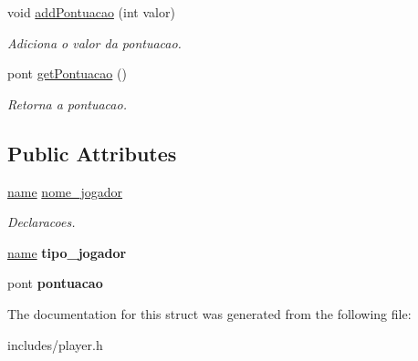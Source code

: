 \begin{DoxyCompactItemize}
void \hyperlink{structpl_1_1Player_a28cc93228bd7a418e44c5e03ff15c07e}{add\+Pontuacao} (int valor)
\begin{DoxyCompactList}\small\item\em Adiciona o valor da pontuacao. \end{DoxyCompactList}\item 
\mbox{\label{structpl_1_1Player_a8ce6bc7949b1f6d2c59e78f701835767}} 
pont \hyperlink{structpl_1_1Player_a8ce6bc7949b1f6d2c59e78f701835767}{get\+Pontuacao} ()
\begin{DoxyCompactList}\small\item\em Retorna a pontuacao. \end{DoxyCompactList}\end{DoxyCompactItemize}
\subsection*{Public Attributes}
\begin{DoxyCompactItemize}
\item 
\mbox{\label{structpl_1_1Player_afa453fd1732545ddbcdb63fb7c0e091c}} 
\hyperlink{structpl_1_1Player_a77a12ed18c2601e66b9357ce1a2c1d2b}{name} \hyperlink{structpl_1_1Player_afa453fd1732545ddbcdb63fb7c0e091c}{nome\+\_\+jogador}
\begin{DoxyCompactList}\small\item\em Declaracoes. \end{DoxyCompactList}\item 
\mbox{\label{structpl_1_1Player_a44ef293c5b8359c91d5cd3625d0fe7e6}} 
\hyperlink{structpl_1_1Player_a77a12ed18c2601e66b9357ce1a2c1d2b}{name} {\bfseries tipo\+\_\+jogador}
\item 
\mbox{\label{structpl_1_1Player_aa7b2eca536f532fca2de75e5638bf6f6}} 
pont {\bfseries pontuacao}
\end{DoxyCompactItemize}


The documentation for this struct was generated from the following file\+:\begin{DoxyCompactItemize}
\item 
includes/player.\+h\end{DoxyCompactItemize}
